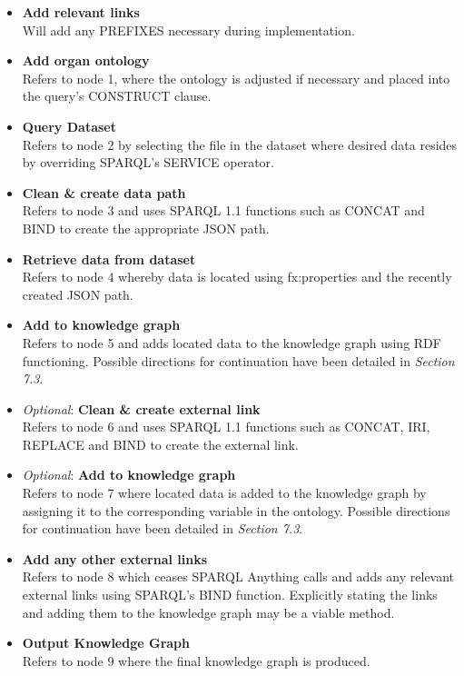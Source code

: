 \begin{itemize}
    \item \textbf{Add relevant links} \\ Will add any PREFIXES necessary during implementation. 
    \item \textbf{Add organ ontology} \\  Refers to node 1, where the ontology is adjusted if necessary and placed into the query's CONSTRUCT clause. 
    \item \textbf{Query Dataset} \\ Refers to node 2 by selecting the file in the dataset where desired data resides by overriding SPARQL's SERVICE operator.
    \item \textbf{Clean \& create data path} \\ Refers to node 3 and uses SPARQL 1.1 functions such as CONCAT and BIND to create the appropriate JSON path. 
    \item \textbf{Retrieve data from dataset} \\ Refers to node 4 whereby data is located using fx:properties and the recently created JSON path. 
    \item \textbf{Add to knowledge graph} \\ Refers to node 5 and adds located data to the knowledge graph using RDF functioning. Possible directions for continuation have been detailed in \textit{Section 7.3}.
    \item \textit{Optional}: \textbf{Clean \& create external link} \\ Refers to node 6 and uses SPARQL 1.1 functions such as CONCAT, IRI, REPLACE and BIND to create the external link.
    \item  \textit{Optional}: \textbf{Add to knowledge graph} \\ Refers to node 7 where located data is added to the knowledge graph by assigning it to the corresponding variable in the ontology. Possible directions for continuation have been detailed in \textit{Section 7.3}.
    \item \textbf{Add any other external links} \\ Refers to node 8 which ceases SPARQL Anything calls and adds any relevant external links using SPARQL's BIND function. Explicitly stating the links and adding them to the knowledge graph may be a viable method. 
    \item \textbf{Output Knowledge Graph} \\ Refers to node 9 where the final knowledge graph is produced. 
\end{itemize}

